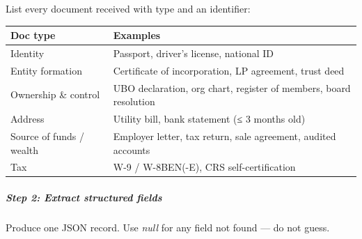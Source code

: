 \documentclass[11pt]{article}
\begin{document}
List every document received with type and an identifier:


\begingroup
\small
\setlength{\tabcolsep}{2pt}
\begin{longtable}{>{\RaggedRight\arraybackslash\hspace{0pt}}p{}>{\RaggedRight\arraybackslash\hspace{0pt}}p{}}
\toprule
{} \textbf{Doc type} & \textbf{Examples} \\
\midrule
{} Identity & Passport, driver's license, national ID \\
{} Entity formation & Certificate of incorporation, LP agreement, trust deed \\
{} Ownership \& control & UBO declaration, org chart, register of members, board resolution \\
{} Address & Utility bill, bank statement (≤ 3 months old) \\
{} Source of funds /  wealth & Employer letter, tax return, sale agreement, audited accounts \\
{} Tax & W-9 /  W-8BEN(-E), CRS self-certification \\
\bottomrule
\end{longtable}
\endgroup

\subparagraph{Step 2: Extract structured fields}\mbox{}\par

Produce one JSON record. Use \emph{null} for any field not found — do not guess.
\end{document}
